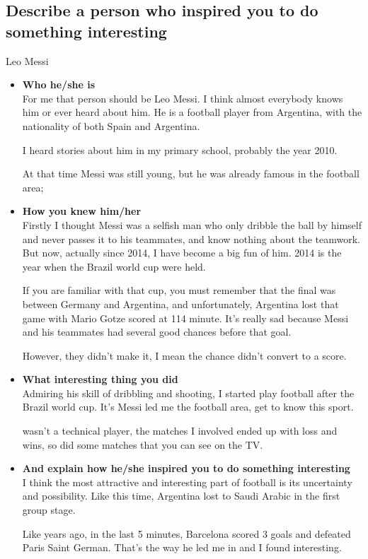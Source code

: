 \documentclass[conference]{IEEEtran}
\begin{document}
\subsection{Describe a person who inspired you to do something interesting}
Leo Messi
\begin{itemize}
    \item \textbf{Who he/she is}\\
    For me that person should be Leo Messi. I think almost everybody knows him or ever heard about him.
    He is a football player from Argentina, with the nationality of both Spain and Argentina.

    I heard stories about him in my primary school, probably the year 2010.

    At that time Messi was still young, but he was already famous in the football area;
    \item \textbf{How you knew him/her}\\
    Firstly I thought Messi was a selfish man who only dribble the ball by himself and never passes it to his teammates,
    and know nothing about the teamwork. But now, actually since 2014, I have become a big fun of him.
    2014 is the year when the Brazil world cup were held.

    If you are familiar with that cup, you must remember that the final was between Germany and Argentina,
    and unfortunately, Argentina lost that game with Mario Gotze scored at 114 minute.
    It's really sad because Messi and his teammates had several good chances before that goal.

    However, they didn't make it, I mean the chance didn't convert to a score.
    \item \textbf{What interesting thing you did}\\
    Admiring his skill of dribbling and shooting, I started play football after the Brazil world cup.
    It's Messi led me the football area, get to know this sport.

    wasn't a technical player, the matches I involved ended up with loss and wins, so did some matches
    that you can see on the TV.
    \item \textbf{And explain how he/she inspired you to do something interesting}\\
    I think the most attractive and interesting part of football is its uncertainty and possibility.
    Like this time, Argentina lost to Saudi Arabic in the first group stage.

    Like years ago, in the last 5 minutes, Barcelona scored 3 goals and defeated Paris Saint German.
    That's the way he led me in and I found interesting.
\end{itemize}
\end{document}
